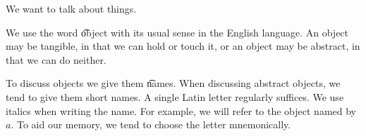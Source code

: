 

We want to talk about things.


We use the word \t{object} with its usual sense in the English language.
An object may be tangible, in that we can hold or touch it, or an object may be abstract, in that we can do neither.

To discuss objects we give them \t{names}.
When discussing abstract objects, we tend to give them short names.
A single Latin letter regularly suffices.
We use italics when writing the name.
For example, we will refer to the object named  by $a$.
To aid our memory, we tend to choose the letter mnemonically.

\blankpage
